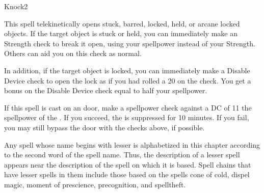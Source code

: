 \begin{spellsection}{Knock}{2}
    \begin{spellheader}
    \end{spellheader}
    \begin{spellcontent}
        \begin{spelltargetinginfo}
        \end{spelltargetinginfo}
        \begin{spelleffects}
            \spelleffect This spell telekinetically opens stuck, barred, locked, held, or arcane locked objects. If the target object is stuck or held, you can immediately make an Strength check to break it open, using your spellpower instead of your Strength. Others can aid you on this check as normal.

            In addition, if the target object is locked, you can immediately make a Disable Device check to open the lock as if you had rolled a 20 on the check. You get a bonus on the Disable Device check equal to half your spellpower.
        \end{spelleffects}
    \end{spellcontent}
    \begin{spellfooter}
        \spellnotes If this spell is cast on an  door, make a spellpower check against a DC of 11 \add the spellpower of the . If you succeed, the  is suppressed for 10 minutes. If you fail, you may still bypass the door with the checks above, if possible.
        \miscastrandom
    \end{spellfooter}
\end{spellsection}

\par Any spell whose name begins with lesser is alphabetized in this chapter according to the second word of the spell name. Thus, the description of a lesser spell appears near the description of the spell on which it is based. Spell chains that have lesser spells in them include those based on the spells cone of cold, dispel magic, moment of prescience, precognition, and spelltheft.

